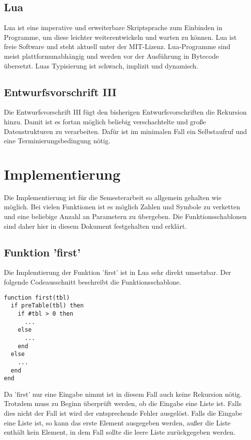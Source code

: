 \section{Lua}
Lua ist eine imperative und erweiterbare Skriptsprache zum Einbinden in Programme, um diese leichter weiterentwickeln und warten zu können. Lua ist freie Software und steht aktuell unter der MIT-Lizenz. Lua-Programme sind meist plattformunabhängig und werden vor der Ausführung in Bytecode übersetzt. Luas Typisierung ist schwach, implizit und dynamisch.


\section{Entwurfsvorschrift III}
Die Entwurfsvorschrift III fügt den bisherigen Entwurfsvorschriften die Rekursion hinzu. Damit ist es fortan möglich beliebig verschachtelte und große Datenstrukturen zu verarbeiten. Dafür ist im minimalen Fall ein Selbstaufruf und eine Terminierungsbedingung nötig.

\chapter{Implementierung}
Die Implementierung ist für die Semesterarbeit so allgemein gehalten wie möglich. Bei vielen Funktionen ist es möglich Zahlen und Symbole zu verketten und eine beliebige Anzahl an Parametern zu übergeben. Die Funktionsschablonen sind daher hier in diesem Dokument festgehalten und erklärt.

\section{Funktion 'first'}
Die Implemtierung der Funktion 'first' ist in Lua sehr direkt umsetzbar. Der folgende Codeausschnitt beschreibt die Funktionsschablone.
\begin{lstlisting}
function first(tbl)
  if preTable(tbl) then
    if #tbl > 0 then
      ...
    else
      ...
    end
  else
    ...
  end
end
\end{lstlisting}

Da 'first' nur eine Eingabe nimmt ist in diesem Fall auch keine Rekursion nötig. Trotzdem muss zu Beginn überprüft werden, ob die Eingabe eine Liste ist. Falls dies nicht der Fall ist wird der entsprechende Fehler ausgelöst. Falls die Eingabe eine Liste ist, so kann das erste Element ausgegeben werden, außer die Liste enthält kein Element, in dem Fall sollte die leere Liste zurückgegeben werden.

